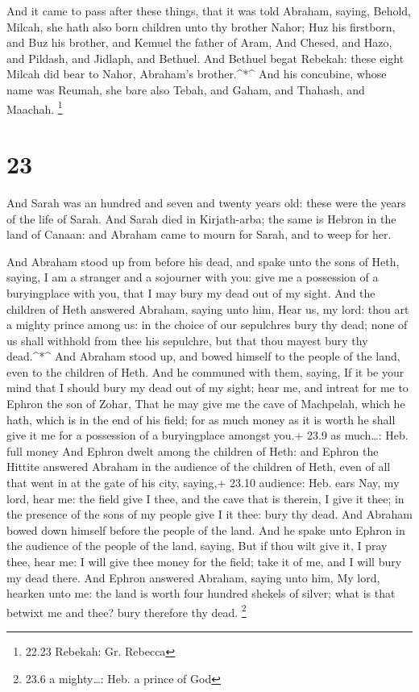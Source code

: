  And it came to pass after these things, that it was told
Abraham, saying, Behold, Milcah, she hath also born children unto thy
brother Nahor;  Huz his firstborn, and Buz his brother, and
Kemuel the father of Aram,  And Chesed, and Hazo, and
Pildash, and Jidlaph, and Bethuel.  And Bethuel begat
Rebekah: these eight Milcah did bear to Nahor, Abraham's
brother.\^{}*\^{}  And his concubine, whose name was
Reumah, she bare also Tebah, and Gaham, and Thahash, and Maachah.
\footnote{22.23 Rebekah: Gr. Rebecca}

\hypertarget{section-22}{%
\section{23}\label{section-22}}

 And Sarah was an hundred and seven and twenty years old:
these were the years of the life of Sarah.  And Sarah died
in Kirjath-arba; the same is Hebron in the land of Canaan: and Abraham
came to mourn for Sarah, and to weep for her.

 And Abraham stood up from before his dead, and spake unto
the sons of Heth, saying,  I am a stranger and a sojourner
with you: give me a possession of a buryingplace with you, that I may
bury my dead out of my sight.  And the children of Heth
answered Abraham, saying unto him,  Hear us, my lord: thou
art a mighty prince among us: in the choice of our sepulchres bury thy
dead; none of us shall withhold from thee his sepulchre, but that thou
mayest bury thy dead.\^{}*\^{}  And Abraham stood up, and
bowed himself to the people of the land, even to the children of Heth.
 And he communed with them, saying, If it be your mind that
I should bury my dead out of my sight; hear me, and intreat for me to
Ephron the son of Zohar,  That he may give me the cave of
Machpelah, which he hath, which is in the end of his field; for as much
money as it is worth he shall give it me for a possession of a
buryingplace amongst you.+ 23.9 as much\ldots: Heb. full money
 And Ephron dwelt among the children of Heth: and Ephron
the Hittite answered Abraham in the audience of the children of Heth,
even of all that went in at the gate of his city, saying,+ 23.10
audience: Heb. ears  Nay, my lord, hear me: the field give
I thee, and the cave that is therein, I give it thee; in the presence of
the sons of my people give I it thee: bury thy dead.  And
Abraham bowed down himself before the people of the land. 
And he spake unto Ephron in the audience of the people of the land,
saying, But if thou wilt give it, I pray thee, hear me: I will give thee
money for the field; take it of me, and I will bury my dead there.
 And Ephron answered Abraham, saying unto him,
 My lord, hearken unto me: the land is worth four hundred
shekels of silver; what is that betwixt me and thee? bury therefore thy
dead. \footnote{23.6 a mighty\ldots: Heb. a prince of God}

